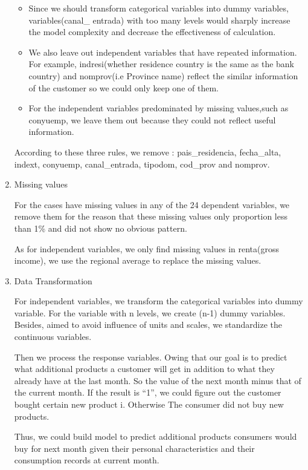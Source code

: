 \documentclass{article}
\begin{document}
\begin{spacing}{1}
\begin{large}
\begin{enumerate}
	\begin{itemize}
		\item Since we should transform categorical variables into dummy variables, variables(canal\_ entrada) with too many levels would sharply increase the model complexity and decrease the effectiveness of calculation.
		
		\item We also leave out independent variables that have repeated information. For example, indresi(whether residence country is the same as the bank country) and nomprov(i.e Province name) reflect the similar information of the customer so we could only keep one of them. 
		
		\item For the independent variables predominated by missing values,such as conyuemp, we leave them out because they could not reflect useful information. 
	\end{itemize}
	
	According to these three  rules, we remove : pais\_residencia, fecha\_alta, indext, conyuemp, canal\_entrada, tipodom, cod\_prov and nomprov. 
	
	\item  Missing values
	
	For the cases have missing values in any of the 24 dependent variables, we remove them for the reason that these missing values only proportion less than 1\% and did not show no obvious pattern. 
	
	As for independent variables, we only find missing values in renta(gross income), we use the regional average to replace the missing values. 
	
	\item Data Transformation
	
	For independent variables, we transform the categorical variables into dummy variable. For the variable with n levels, we create (n-1) dummy variables. Besides, aimed to avoid influence of units and scales, we standardize the continuous variables. 
	
	Then we process the response variables.  Owing that our goal is to predict what additional products a customer will get in addition to what they already have at the last month. So the value of the next month minus that of the current month.  If the result is “1”, we could figure out the customer bought certain new product i. Otherwise The consumer did not buy new products. 
	
	Thus, we could build model to predict additional products consumers would buy for next month given their personal characteristics and their consumption records at current month.
\end{enumerate}


\end{large}
\end{spacing}
\end{document}
